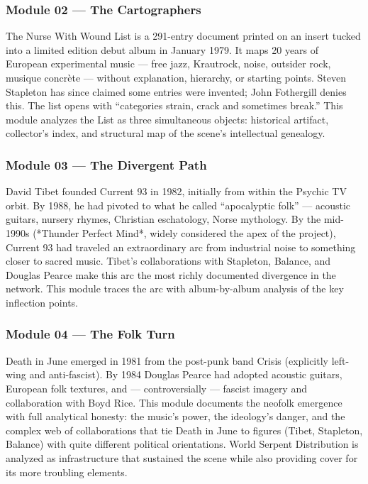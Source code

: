 \documentclass[11pt,letterpaper]{article}
\begin{document}
\subsubsection{Module 02 --- The Cartographers}

The Nurse With Wound List is a 291-entry document printed on an insert tucked into a limited
edition debut album in January 1979. It maps 20 years of European experimental music — free
jazz, Krautrock, noise, outsider rock, musique concrète — without explanation, hierarchy, or
starting points. Steven Stapleton has since claimed some entries were invented; John Fothergill
denies this. The list opens with ``categories strain, crack and sometimes break.'' This module
analyzes the List as three simultaneous objects: historical artifact, collector's index, and
structural map of the scene's intellectual genealogy.

\subsubsection{Module 03 --- The Divergent Path}

David Tibet founded Current 93 in 1982, initially from within the Psychic TV orbit. By 1988,
he had pivoted to what he called ``apocalyptic folk'' — acoustic guitars, nursery rhymes,
Christian eschatology, Norse mythology. By the mid-1990s (*Thunder Perfect Mind*, widely
considered the apex of the project), Current 93 had traveled an extraordinary arc from
industrial noise to something closer to sacred music. Tibet's collaborations with Stapleton,
Balance, and Douglas Pearce make this arc the most richly documented divergence in the network.
This module traces the arc with album-by-album analysis of the key inflection points.

\subsubsection{Module 04 --- The Folk Turn}

Death in June emerged in 1981 from the post-punk band Crisis (explicitly left-wing and
anti-fascist). By 1984 Douglas Pearce had adopted acoustic guitars, European folk textures,
and — controversially — fascist imagery and collaboration with Boyd Rice. This module documents
the neofolk emergence with full analytical honesty: the music's power, the ideology's danger,
and the complex web of collaborations that tie Death in June to figures (Tibet, Stapleton,
Balance) with quite different political orientations. World Serpent Distribution is analyzed as
infrastructure that sustained the scene while also providing cover for its more troubling elements.
\end{document}
